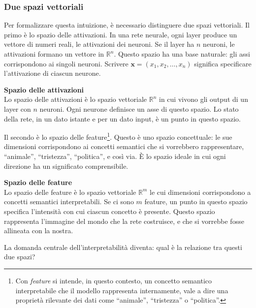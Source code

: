 \subsubsection{Due spazi vettoriali}
Per formalizzare questa intuizione, è necessario distinguere due spazi vettoriali.
Il primo è lo spazio delle attivazioni. In una rete neurale, ogni layer produce un vettore di numeri reali, le attivazioni dei neuroni. Se il layer ha $n$ neuroni, le attivazioni formano un vettore in $\mathbb{R}^n$. Questo spazio ha una base naturale: gli assi corrispondono ai singoli neuroni. Scrivere $\mathbf{x} = (x_1, x_2, \dots, x_n)$ significa specificare l'attivazione di ciascun neurone.
\begin{notebox}
\textbf{Spazio delle attivazioni}\\
Lo spazio delle attivazioni è lo spazio vettoriale $\mathbb{R}^n$ in cui vivono gli output di un layer con $n$ neuroni. Ogni neurone definisce un asse di questo spazio. Lo stato della rete, in un dato istante e per un dato input, è un punto in questo spazio.
\end{notebox}
Il secondo è lo spazio delle feature\footnote{Con \textit{feature} si intende, in questo contesto, un concetto semantico interpretabile che il modello rappresenta internamente, vale a dire una proprietà rilevante dei dati come ``animale'', ``tristezza'' o ``politica''.}. Questo è uno spazio concettuale: le sue dimensioni corrispondono ai concetti semantici che si vorrebbero rappresentare, ``animale'', ``tristezza'', ``politica'', e così via. È lo spazio ideale in cui ogni direzione ha un significato comprensibile.
\begin{notebox}
\textbf{Spazio delle feature}\\
Lo spazio delle feature è lo spazio vettoriale $\mathbb{R}^m$ le cui dimensioni corrispondono a concetti semantici interpretabili. Se ci sono $m$ feature, un punto in questo spazio specifica l'intensità con cui ciascun concetto è presente. Questo spazio rappresenta l'immagine del mondo che la rete costruisce, e che si vorrebbe fosse allineata con la nostra.
\end{notebox}
La domanda centrale dell'interpretabilità diventa: qual è la relazione tra questi due spazi?
